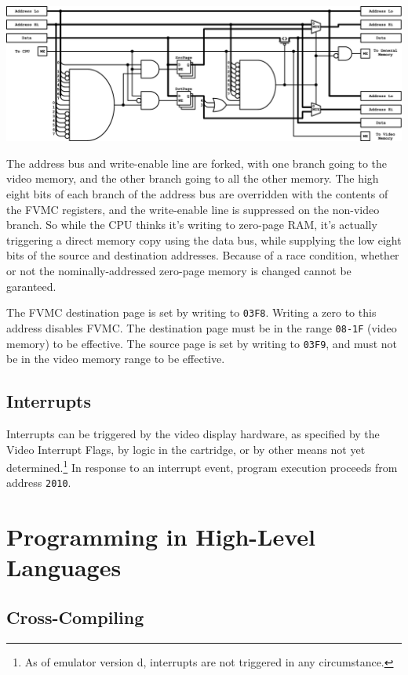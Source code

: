 \documentclass[12pt]{{memoir}}
\begin{document}
\begin{center}\includegraphics[width=\textwidth]{fvmc}\end{center}

The address bus and write-enable line are forked, with one branch going to the video memory, and the other branch going to all the other memory. The high eight bits of each branch of the address bus are overridden with the contents of the FVMC registers, and the write-enable line is suppressed on the non-video branch. So while the CPU thinks it's writing to zero-page RAM, it's actually triggering a direct memory copy using the data bus, while supplying the low eight bits of the source and destination addresses. Because of a race condition, whether or not the nominally-addressed zero-page memory is changed cannot be garanteed.

The FVMC destination page is set by writing to \texttt{03F8}. Writing a zero to this address disables FVMC. The destination page must be in the range \texttt{08-1F} (video memory) to be effective. The source page is set by writing to \texttt{03F9}, and must not be in the video memory range to be effective.

\section{Interrupts}

Interrupts can be triggered by the video display hardware, as specified by the Video Interrupt Flags, by logic in the cartridge, or by other means not yet determined.\footnote{As of emulator version d, interrupts are not triggered in any circumstance.} In response to an interrupt event, program execution proceeds from address \texttt{2010}.

\chapter{Programming in High-Level Languages}
\section{Cross-Compiling}
\end{document}
